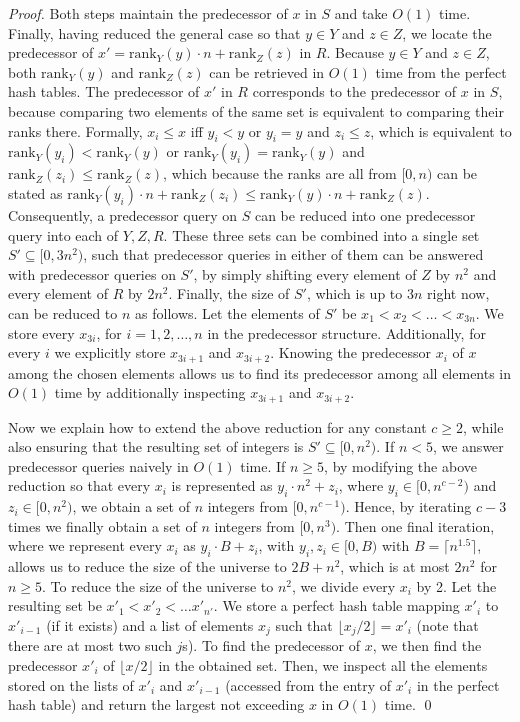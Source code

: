 \documentclass{llncs}
\begin{document}
\begin{proof}
Both steps maintain the predecessor of $x$ in $S$ and take $O(1)$ time.
Finally, having reduced the general case so that $y\in Y$ and $z\in Z$, we
locate the predecessor of $x'=\text{rank}_{Y}(y)\cdot n+\text{rank}_{Z}(z)$ in $R$.
Because $y\in Y$ and $z\in Z$, both $\text{rank}_{Y}(y)$ and $\text{rank}_{Z}(z)$ can be
retrieved in $O(1)$ time from the perfect hash tables.
The predecessor of $x'$ in $R$ corresponds to the predecessor of $x$ in $S$,
because comparing two elements of the same set is equivalent to comparing their ranks there.
Formally, $x_i \leq x$ iff $y_i < y$ or $y_i=y$ and $z_i \leq z$, which is equivalent
to $\text{rank}_{Y}(y_i) < \text{rank}_{Y}(y)$ or $\text{rank}_{Y}(y_i)=\text{rank}_{Y}(y)$
and $\text{rank}_{Z}(z_i) \leq \text{rank}_{Z}(z)$, which because the ranks are all from $[0,n)$
can be stated as $\text{rank}_{Y}(y_i)\cdot n+\text{rank}_{Z}(z_i) \leq \text{rank}_{Y}(y)\cdot n
+\text{rank}_{Z}(z)$.
Consequently, a predecessor query on $S$ can be reduced into one predecessor query
into each of $Y,Z,R$. These three sets can be combined into a single set $S' \subseteq [0,3n^2)$,
such that predecessor queries in either of them
can be answered with predecessor queries on $S'$, by simply shifting every element of $Z$ by $n^{2}$
and every element of $R$ by $2n^{2}$.
Finally, the size of $S'$, which is up to $3n$ right now, can be reduced to $n$ as follows.
Let the elements of $S'$ be $x_{1}<x_{2}< \ldots < x_{3n}$. We store every $x_{3i}$,
for $i=1,2,\ldots,n$ in the predecessor structure. Additionally, for every $i$ we
explicitly store $x_{3i+1}$ and $x_{3i+2}$. Knowing the predecessor $x_{i}$ of $x$ among the
chosen elements allows us to find its predecessor among all elements in $O(1)$ time by additionally
inspecting $x_{3i+1}$ and $x_{3i+2}$.

Now we explain how to extend the above reduction for any constant $c\geq 2$, while also
ensuring that the resulting set of integers is $S'\subseteq [0,n^2)$.
If $n < 5$, we answer predecessor queries naively in $O(1)$ time.
If $n\geq 5$, by modifying the above reduction so that every $x_i$ is represented as $y_i \cdot n^2+z_i$,
where $y_i\in[0,n^{c-2})$ and $z_i\in [0,n^2)$, we obtain a set of $n$ integers from $[0,n^{c-1})$.
Hence, by iterating $c-3$ times we finally obtain a set of $n$ integers from $[0,n^3)$.
Then one final iteration, where we represent every $x_i$ as $y_i\cdot B + z_i$,
with $y_i,z_i\in[0,B)$ with $B=\lceil n^{1.5} \rceil$,
allows us to reduce the size of the universe to $2B+n^{2}$, which is at most $2n^{2}$
for $n\geq 5$.
To reduce the size of the universe to $n^{2}$, we divide every $x_{i}$ by 2.
Let the resulting set be $x'_{1}<x'_{2}<\ldots x'_{n'}$. 
We store a perfect hash table mapping $x'_{i}$ to $x'_{i-1}$ (if it exists) and a list of elements $x_{j}$ such that
$\lfloor x_{j}/2\rfloor = x'_{i}$ (note that there are at most two such $j$s).
To find the predecessor of $x$, we then find the predecessor $x'_{i}$ of $\lfloor x/2\rfloor$ in the obtained set.
Then, we inspect all the elements stored on the lists of $x'_{i}$ and $x'_{i-1}$ (accessed from the entry of $x'_{i}$ in the
perfect hash table) and return the largest not exceeding $x$ in $O(1)$ time.
\qed \end{proof}
\end{document}
